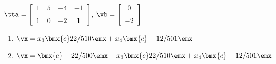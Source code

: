 {$\tta = \left[ \begin {array}{cccc} 1&5&-4&-1\\\noalign{\medskip}1&0&-2&1
\end {array} \right] $, 
$\vb=\left[ \begin {array}{c} 0\\\noalign{\medskip}-2\end {array} \right] $}
{\begin{enumerate}
\item	 $\vx=x_3\bmx{c}2\\2/5\\1\\0\emx+x_4\bmx{c}-1\\2/5\\0\\1\emx$

\item	$\vx=\bmx{c}-2\\2/5\\0\\0\emx + x_3\bmx{c}2\\2/5\\1\\0\emx +x_4\bmx{c}-1\\2/5\\0\\1\emx$
\end{enumerate}}

 
 









